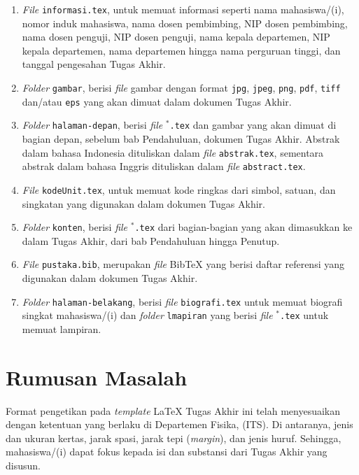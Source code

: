 \begin{enumerate}[noitemsep]
    \item \textit{File} \texttt{informasi.tex}, untuk memuat informasi seperti nama mahasiswa/(i), nomor induk mahasiswa, nama dosen pembimbing, NIP dosen pembimbing, nama dosen penguji, NIP dosen penguji, nama kepala departemen, NIP kepala departemen, nama departemen hingga nama perguruan tinggi, dan tanggal pengesahan Tugas Akhir.
    \item \textit{Folder} \texttt{gambar}, berisi \textit{file} gambar dengan format \texttt{jpg}, \texttt{jpeg}, \texttt{png}, \texttt{pdf}, \texttt{tiff} dan/atau \texttt{eps} yang akan dimuat dalam dokumen Tugas Akhir.
    \item \textit{Folder} \texttt{halaman-depan}, berisi \textit{file} \texttt{$^*$.tex} dan gambar yang akan dimuat di bagian depan, sebelum bab Pendahuluan, dokumen Tugas Akhir. Abstrak dalam bahasa Indonesia dituliskan dalam \textit{file} \texttt{abstrak.tex}, sementara abstrak dalam bahasa Inggris dituliskan dalam \textit{file} \texttt{abstract.tex}.
    \item \textit{File} \texttt{kodeUnit.tex}, untuk memuat kode ringkas dari simbol, satuan, dan singkatan yang digunakan dalam dokumen Tugas Akhir.
    \item \textit{Folder} \texttt{konten}, berisi \textit{file} \texttt{$^*$.tex} dari bagian-bagian yang akan dimasukkan ke dalam Tugas Akhir, dari bab Pendahuluan hingga Penutup.
    \item \textit{File} \texttt{pustaka.bib}, merupakan \textit{file} BibTeX yang berisi daftar referensi yang digunakan dalam dokumen Tugas Akhir.
    \item \textit{Folder} \texttt{halaman-belakang}, berisi \textit{file} \texttt{biografi.tex} untuk memuat biografi singkat mahasiswa/(i) dan \textit{folder} \texttt{lmapiran} yang berisi \textit{file} \texttt{$^*$.tex} untuk memuat lampiran.
\end{enumerate}


\section{Rumusan Masalah}

Format pengetikan pada \textit{template} \LaTeX{} Tugas Akhir ini telah menyesuaikan dengan ketentuan yang berlaku di Departemen Fisika, \its{} (ITS). Di antaranya, jenis dan ukuran kertas, jarak spasi, jarak tepi (\textit{margin}), dan jenis huruf. Sehingga, mahasiswa/(i) dapat fokus kepada isi dan substansi dari Tugas Akhir yang disusun.



